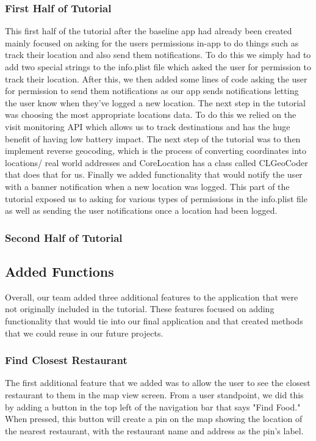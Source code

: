 \documentclass[conference]{IEEEtran}
\begin{document}
\subsubsection{First Half of Tutorial}
This first half of the tutorial after the baseline app had already been 
created mainly focused on asking for the users permissions in-app to do 
things such as track their location and also send them notifications. To do 
this we simply had to add two special strings to the info.plist file which 
asked the user for permission to track their location. After this, we then 
added some lines of code asking the user for permission to send them notifications 
as our app sends notifications letting the user know when they've logged a new 
location. The next step in the tutorial was choosing the most appropriate locations 
data. To do this we relied on the visit monitoring API which allows us to track 
destinations and has the huge benefit of having low battery impact. The next 
step of the tutorial was to then implement reverse geocoding, which is the 
process of converting coordinates into locations/ real world addresses and 
CoreLocation has a class called CLGeoCoder that does that for us. Finally we 
added functionality that would notify the user with a banner notification when 
a new location was logged. This part of the tutorial exposed us to asking for 
various types of permissions in the info.plist file as well as sending the user 
notifications once a location had been logged.

\subsubsection{Second Half of Tutorial}

\subsection{Added Functions}
Overall, our team added three additional features to the application that were not 
originally included in the tutorial. These features focused on adding functionality
that would tie into our final application and that created methods that we could
reuse in our future projects.

\subsubsection{Find Closest Restaurant}
The first additional feature that we added was to allow the user to see the closest
restaurant to them in the map view screen. From a user standpoint, we did this by 
adding a button in the top left of the navigation bar that says "Find Food." When 
pressed, this button will create a pin on the map showing the location of the nearest
restaurant, with the restaurant name and address as the pin's label.
\end{document}
